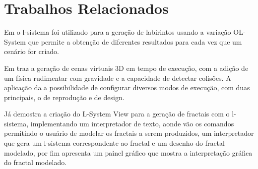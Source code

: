 \section{Trabalhos Relacionados}
Em \cite{etchebeheresystems} o l-sistema foi utilizado para a geração de labirintos usando a variação OL-System que permite a obtenção de diferentes resultados para cada vez que um cenário for criado.

Em \cite{fridenfalk2015application} traz a geração de cenas virtuais 3D em tempo de execução, com a adição de um física rudimentar com gravidade e a capacidade de detectar colisões. A aplicação da a possibilidade de configurar diversos modos de execução, com duas principais, o de reprodução e de design.

Já \cite{santos1desenvolvimento} demostra a criação do L-System View para a geração de fractais com o l-sistema, implementando um interpretador de texto, aonde vão os comandos permitindo o usuário de modelar os fractais a serem produzidos, um interpretador que gera um l-sistema correspondente ao fractal e um desenho do fractal modelado, por fim apresenta um painel gráfico que mostra a interpretação gráfica do fractal modelado.